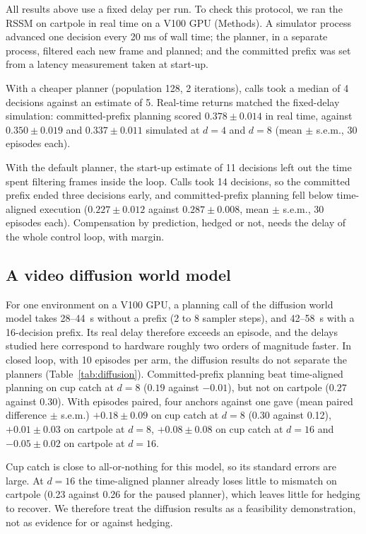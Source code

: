 \documentclass[pdflatex,sn-nature]{sn-jnl}%
\begin{document}
All results above use a fixed delay per run. To check this protocol, we ran the RSSM on cartpole in real time on a V100 GPU (Methods). A simulator process advanced one decision every 20 ms of wall time; the planner, in a separate process, filtered each new frame and planned; and the committed prefix was set from a latency measurement taken at start-up.

With a cheaper planner (population 128, 2 iterations), calls took a median of 4 decisions against an estimate of 5. Real-time returns matched the fixed-delay simulation: committed-prefix planning scored $0.378\pm0.014$ in real time, against $0.350\pm0.019$ and $0.337\pm0.011$ simulated at $d=4$ and $d=8$ (mean $\pm$ s.e.m., 30 episodes each).

With the default planner, the start-up estimate of 11 decisions left out the time spent filtering frames inside the loop. Calls took 14 decisions, so the committed prefix ended three decisions early, and committed-prefix planning fell below time-aligned execution ($0.227\pm0.012$ against $0.287\pm0.008$, mean $\pm$ s.e.m., 30 episodes each). Compensation by prediction, hedged or not, needs the delay of the whole control loop, with margin.

\subsection{A video diffusion world model}\label{sec:diffusion}

For one environment on a V100 GPU, a planning call of the diffusion world model takes 28--44~s without a prefix (2 to 8 sampler steps), and 42--58~s with a 16-decision prefix. Its real delay therefore exceeds an episode, and the delays studied here correspond to hardware roughly two orders of magnitude faster. In closed loop, with 10 episodes per arm, the diffusion results do not separate the planners (Table~\ref{tab:diffusion}). Committed-prefix planning beat time-aligned planning on cup catch at $d=8$ ($0.19$ against $-0.01$), but not on cartpole ($0.27$ against $0.30$). With episodes paired, four anchors against one gave (mean paired difference $\pm$ s.e.m.) $+0.18\pm0.09$ on cup catch at $d=8$ (0.30 against 0.12), $+0.01\pm0.03$ on cartpole at $d=8$, $+0.08\pm0.08$ on cup catch at $d=16$ and $-0.05\pm0.02$ on cartpole at $d=16$.

Cup catch is close to all-or-nothing for this model, so its standard errors are large. At $d=16$ the time-aligned planner already loses little to mismatch on cartpole (0.23 against 0.26 for the paused planner), which leaves little for hedging to recover. We therefore treat the diffusion results as a feasibility demonstration, not as evidence for or against hedging.
\end{document}
